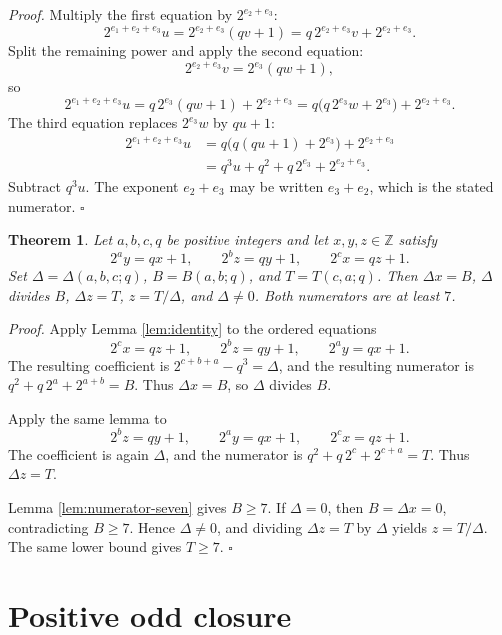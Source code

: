\documentclass[11pt,letterpaper]{article}
\newcommand{\Z}{\mathbb{Z}}
\newtheorem{theorem}{Theorem}
\newenvironment{proof}{\noindent\textit{Proof.}}{\hfill\(\square\)}
\begin{document}
\begin{proof}
Multiply the first equation by \(2^{e_{2}+e_{3}}\):
\[
2^{e_{1}+e_{2}+e_{3}}u
  =2^{e_{2}+e_{3}}(qv+1)
  =q\,2^{e_{2}+e_{3}}v+2^{e_{2}+e_{3}}.
\]
Split the remaining power and apply the second equation:
\[
2^{e_{2}+e_{3}}v=2^{e_{3}}(qw+1),
\]
so
\[
2^{e_{1}+e_{2}+e_{3}}u
  =q\,2^{e_{3}}(qw+1)+2^{e_{2}+e_{3}}
  =q\bigl(q\,2^{e_{3}}w+2^{e_{3}}\bigr)+2^{e_{2}+e_{3}}.
\]
The third equation replaces \(2^{e_{3}}w\) by \(qu+1\):
\begin{align*}
2^{e_{1}+e_{2}+e_{3}}u
  &=q\bigl(q(qu+1)+2^{e_{3}}\bigr)+2^{e_{2}+e_{3}}\\
  &=q^{3}u+q^{2}+q\,2^{e_{3}}+2^{e_{2}+e_{3}}.
\end{align*}
Subtract \(q^{3}u\). The exponent \(e_{2}+e_{3}\) may be written \(e_{3}+e_{2}\), which is the stated numerator.
\end{proof}

\begin{theorem}
\label{thm:three-affine-closure}
Let \(a,b,c,q\) be positive integers and let \(x,y,z\in\Z\) satisfy
\[
2^{a}y=qx+1,
\qquad
2^{b}z=qy+1,
\qquad
2^{c}x=qz+1.
\]
Set \(\Delta=\Delta(a,b,c;q)\), \(B=B(a,b;q)\), and \(T=T(c,a;q)\). Then \(\Delta x=B\), \(\Delta\) divides \(B\), \(\Delta z=T\), \(z=T/\Delta\), and \(\Delta\neq 0\). Both numerators are at least \(7\).
\end{theorem}

\begin{proof}
Apply Lemma \ref{lem:identity} to the ordered equations
\[
2^{c}x=qz+1,
\qquad
2^{b}z=qy+1,
\qquad
2^{a}y=qx+1.
\]
The resulting coefficient is \(2^{c+b+a}-q^{3}=\Delta\), and the resulting numerator is \(q^{2}+q\,2^{a}+2^{a+b}=B\). Thus \(\Delta x=B\), so \(\Delta\) divides \(B\).

Apply the same lemma to
\[
2^{b}z=qy+1,
\qquad
2^{a}y=qx+1,
\qquad
2^{c}x=qz+1.
\]
The coefficient is again \(\Delta\), and the numerator is \(q^{2}+q\,2^{c}+2^{c+a}=T\). Thus \(\Delta z=T\).

Lemma \ref{lem:numerator-seven} gives \(B\ge 7\). If \(\Delta=0\), then \(B=\Delta x=0\), contradicting \(B\ge 7\). Hence \(\Delta\neq 0\), and dividing \(\Delta z=T\) by \(\Delta\) yields \(z=T/\Delta\). The same lower bound gives \(T\ge 7\).
\end{proof}

\section{Positive odd closure}
\end{document}

